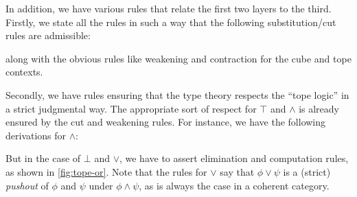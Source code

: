 \documentclass[12pt]{amsart}
\theoremstyle{plain}
\theoremstyle{definition}
\theoremstyle{remark}
\numberwithin{equation}{section}
\newcommand{\types}{\vdash}
\begin{document}
In addition, we have various rules that relate the first two layers to the third.
Firstly, we state all the rules in such a way that the following substitution/cut rules are admissible:
along with the obvious rules like weakening and contraction for the cube and tope contexts.

Secondly, we have rules ensuring that the type theory respects the ``tope logic'' in a strict judgmental way.
The appropriate sort of respect for $\top$ and $\land$ is already ensured by the cut and weakening rules.
For instance, we have the following derivations for $\land$:
But in the case of $\bot$ and $\lor$, we have to assert elimination and computation rules, as shown in \cref{fig:tope-or}.
Note that the rules for $\lor$ say that $\phi\lor\psi$ is a (strict) \emph{pushout} of $\phi$ and $\psi$ under $\phi\land\psi$, as is always the case in a coherent category.
\end{document}
